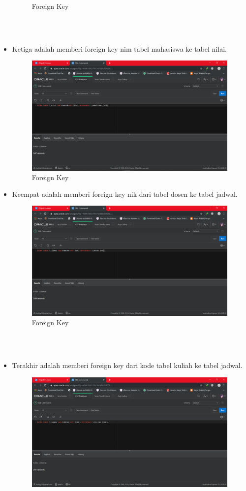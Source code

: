 \documentclass[12pt, times new roman]{article}
\begin{document}
\begin{itemize}
\begin{figure}[htbp]
	\caption{Foreign Key}
\end{figure}\\
\\
\item Ketiga adalah memberi foreign key nim tabel mahasiswa ke tabel nilai.
\begin{figure}[htbp]
	\centering
	\includegraphics[width=10.5cm]{figures/Screenshot_9.png}
	\caption{Foreign Key}
\end{figure}
\item Keempat adalah memberi foreign key nik dari tabel dosen ke tabel jadwal.
\begin{figure}[htbp]
	\centering
	\includegraphics[width=10.5cm]{figures/Screenshot_10.png}
	\caption{Foreign Key}
\end{figure}\\
\\
\item Terakhir adalah memberi foreign key dari kode tabel kuliah ke tabel jadwal.
\begin{figure}[htbp]
	\centering
	\includegraphics[width=10.5cm]{figures/Screenshot_11.png}

\end{figure}
\end{itemize}
\end{document}
